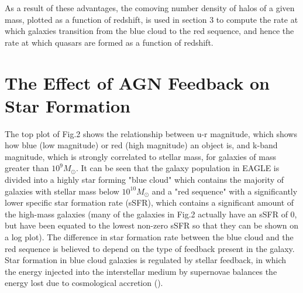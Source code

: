 \documentclass[12pt, twocolumn]{report}%
\begin{document}
As a result of these advantages, the comoving number density of halos of a given mass, plotted as a function of redshift, is used in section 3 to compute the rate at which galaxies transition from the blue cloud to the red sequence, and hence the rate at which quasars are formed as a function of redshift.

\section{The Effect of AGN Feedback on Star Formation}

The top plot of Fig.2 shows the relationship between u-r magnitude, which shows how blue (low magnitude) or red (high magnitude) an object is, and k-band magnitude, which is strongly correlated to stellar mass, for galaxies of mass greater than $10^9M_\odot$. It can be seen that the galaxy population in EAGLE is divided into a highly star forming "blue cloud" which contains the majority of galaxies with stellar mass below $10^{10}M_\odot$ and a "red sequence" with a significantly lower specific star formation rate (sSFR), which contains a significant amount of the high-mass galaxies (many of the galaxies in Fig.2 actually have an sSFR of 0, but have been equated to the lowest non-zero sSFR so that they can be shown on a log plot). The difference in star formation rate between the blue cloud and the red sequence is believed to depend on the type of feedback present in the galaxy. Star formation in blue cloud galaxies is regulated by  stellar feedback, in which the energy injected into the interstellar medium by supernovae balances the energy lost due to cosmological accretion (\cite{Ikea}).

\onecolumngrid
\end{document}

